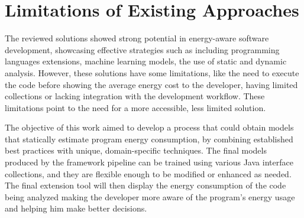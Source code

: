 \section{Limitations of Existing Approaches}

The reviewed solutions showed strong potential in energy-aware software development, showcasing effective strategies such as including programming languages extensions, machine learning models, the use of static and dynamic analysis. However, these solutions have some limitations, like the need to execute the code before showing the average energy cost to the developer, having limited collections or lacking integration with the development workflow. These limitations point to the need for a more accessible, less limited solution.

{
\color{blue}
The objective of this work aimed to develop a process that could obtain models that statically estimate program energy consumption, by combining established best practices with unique, domain-specific techniques. The final models produced by the framework pipeline can be trained using various Java  interface collections, and they are flexible enough to be modified or enhanced as needed. The final extension tool will then display the energy consumption of the code being analyzed making the developer more aware of the program's energy usage and helping him make better decisions.
}
